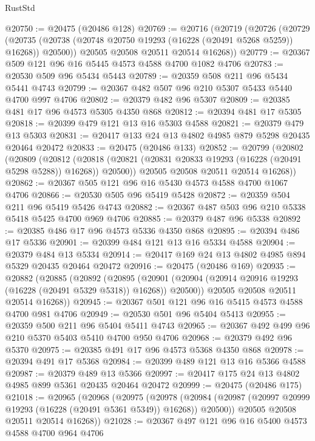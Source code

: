 \begin{lexlean}{RustStd}
\begin{coremodule}
@20750 := @20475 (@20486 @128)
@20769 := @20716
    (@20719
      (@20726
        (@20729
          (@20735 (@20738 (@20748 @20750 @19293 (@16228 (@20491 @5268 @5259)) @16268)) @20500))
        @20505
        @20508
        @20511
        @20514
        @16268))
@20779 := @20367 @509 @121 @96 @16 @5445 @4573 @4588 @4700 @1082 @4706
@20783 := @20530 @509 @96 @5434 @5443
@20789 := @20359 @508 @211 @96 @5434 @5441 @4743
@20799 := @20367 @482 @507 @96 @210 @5307 @5433 @5440 @4700 @997 @4706
@20802 := @20379 @482 @96 @5307
@20809 := @20385 @481 @17 @96 @4573 @5305 @4350 @868
@20812 := @20394 @481 @17 @5305
@20818 := @20399 @479 @121 @13 @16 @5303 @4588
@20821 := @20379 @479 @13 @5303
@20831 := @20417 @133 @24 @13 @4802 @4985 @879 @5298 @20435 @20464 @20472
@20833 := @20475 (@20486 @133)
@20852 := @20799
    (@20802
      (@20809
        (@20812
          (@20818 (@20821 (@20831 @20833 @19293 (@16228 (@20491 @5298 @5288)) @16268)) @20500))
        @20505
        @20508
        @20511
        @20514
        @16268))
@20862 := @20367 @505 @121 @96 @16 @5430 @4573 @4588 @4700 @1067 @4706
@20866 := @20530 @505 @96 @5419 @5428
@20872 := @20359 @504 @211 @96 @5419 @5426 @4743
@20882 := @20367 @487 @503 @96 @210 @5338 @5418 @5425 @4700 @969 @4706
@20885 := @20379 @487 @96 @5338
@20892 := @20385 @486 @17 @96 @4573 @5336 @4350 @868
@20895 := @20394 @486 @17 @5336
@20901 := @20399 @484 @121 @13 @16 @5334 @4588
@20904 := @20379 @484 @13 @5334
@20914 := @20417 @169 @24 @13 @4802 @4985 @894 @5329 @20435 @20464 @20472
@20916 := @20475 (@20486 @169)
@20935 := @20882
    (@20885
      (@20892
        (@20895
          (@20901 (@20904 (@20914 @20916 @19293 (@16228 (@20491 @5329 @5318)) @16268)) @20500))
        @20505
        @20508
        @20511
        @20514
        @16268))
@20945 := @20367 @501 @121 @96 @16 @5415 @4573 @4588 @4700 @981 @4706
@20949 := @20530 @501 @96 @5404 @5413
@20955 := @20359 @500 @211 @96 @5404 @5411 @4743
@20965 := @20367 @492 @499 @96 @210 @5370 @5403 @5410 @4700 @950 @4706
@20968 := @20379 @492 @96 @5370
@20975 := @20385 @491 @17 @96 @4573 @5368 @4350 @868
@20978 := @20394 @491 @17 @5368
@20984 := @20399 @489 @121 @13 @16 @5366 @4588
@20987 := @20379 @489 @13 @5366
@20997 := @20417 @175 @24 @13 @4802 @4985 @899 @5361 @20435 @20464 @20472
@20999 := @20475 (@20486 @175)
@21018 := @20965
    (@20968
      (@20975
        (@20978
          (@20984 (@20987 (@20997 @20999 @19293 (@16228 (@20491 @5361 @5349)) @16268)) @20500))
        @20505
        @20508
        @20511
        @20514
        @16268))
@21028 := @20367 @497 @121 @96 @16 @5400 @4573 @4588 @4700 @964 @4706

\end{coremodule}
\end{lexlean}

